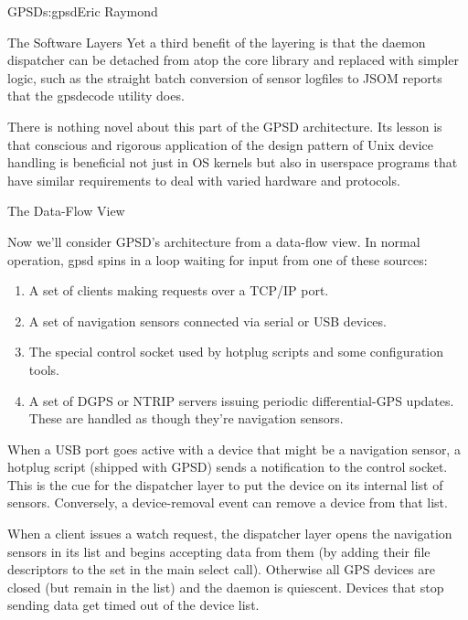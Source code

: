 \begin{aosachapter}{GPSD}{s:gpsd}{Eric Raymond}
\begin{aosasect1}{The Software Layers}
Yet a third benefit of the layering is that the daemon dispatcher can be
detached from atop the core library and replaced with simpler logic,
such as the straight batch conversion of sensor logfiles to JSOM reports
that the gpsdecode utility does.

There is nothing novel about this part of the GPSD architecture. Its
lesson is that conscious and rigorous application of the design pattern
of Unix device handling is beneficial not just in OS kernels but
also in userspace programs that have similar requirements to deal
with varied hardware and protocols.

\end{aosasect1}

\begin{aosasect1}{The Data-Flow View}

Now we'll consider GPSD's architecture from a data-flow view.
In normal operation, gpsd spins in a loop waiting for input from
one of these sources:

\begin{enumerate}

  \item A set of clients making requests over a TCP/IP port.

  \item A set of navigation sensors connected via serial or USB devices.

  \item The special control socket used by hotplug scripts and some
    configuration tools.

  \item A set of DGPS or NTRIP servers issuing periodic
    differential-GPS updates.  These are handled as though they're
    navigation sensors.

\end{enumerate}

When a USB port goes active with a device that might be a navigation
sensor, a hotplug script (shipped with GPSD) sends a notification to
the control socket.  This is the cue for the dispatcher layer to put
the device on its internal list of sensors.  Conversely, a
device-removal event can remove a device from that list.

When a client issues a watch request, the dispatcher layer opens the
navigation sensors in its list and begins accepting data from them (by
adding their file descriptors to the set in the main select
call). Otherwise all GPS devices are closed (but remain in the list)
and the daemon is quiescent. Devices that stop sending data get timed
out of the device list.


\end{aosasect1}
\end{aosachapter}

